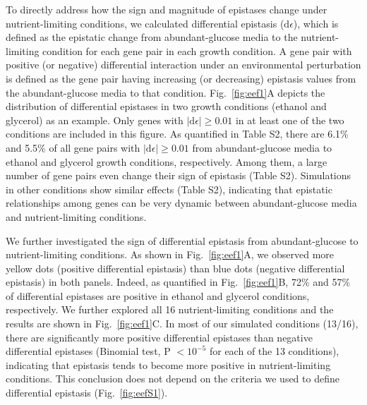 \documentclass[10pt]{article}
\def\D{\mathrm{d}}
\newcommand{\Fig}{Fig.}
\begin{document}
To directly address how the sign and magnitude of epistases change
under nutrient-limiting conditions, we calculated differential
epistasis ($\D\epsilon$), which is defined as the epistatic change from
abundant-glucose media to the nutrient-limiting condition for each
gene pair in each growth condition. A gene pair with positive (or
negative) differential interaction under an environmental perturbation
is defined as the gene pair having increasing (or decreasing)
epistasis values from the abundant-glucose media to that
condition. \Fig~\ref{fig:eef1}A depicts the
distribution of differential
epistases in two growth conditions (ethanol and glycerol) as an
example. Only genes with $\left|\D\epsilon\right| \geq 0.01$ in at least
one of the two conditions are included in this figure. As quantified
in Table S2, there are 6.1\% and 5.5\% of all gene pairs with
$\left|\D\epsilon\right| \geq 0.01$ from abundant-glucose media to ethanol
and glycerol growth conditions, respectively. Among them, a large
number of gene pairs even change their sign of epistasis (Table
S2). Simulations in other conditions show similar effects (Table S2),
indicating that epistatic relationships among genes can be very
dynamic between abundant-glucose media and nutrient-limiting
conditions.



We further investigated the sign of differential epistasis from
abundant-glucose to nutrient-limiting conditions. As shown in \Fig~\ref{fig:eef1}A, 
we observed more yellow dots (positive differential epistasis)
than blue dots (negative differential epistasis) in both
panels. Indeed, as quantified in \Fig~\ref{fig:eef1}B, 72\% and 57\% of
differential epistases are positive in ethanol and glycerol
conditions, respectively. We further explored all 16 nutrient-limiting
conditions and the results are shown in \Fig~\ref{fig:eef1}C. In most of our
simulated conditions (13/16), there are significantly more positive
differential epistases than negative differential epistases (Binomial
test, P $< 10^{-5}$ for each of the 13 conditions), indicating that
epistasis tends to become more positive in nutrient-limiting
conditions. This conclusion does not depend on the criteria we used to
define differential epistasis (\Fig~\ref{fig:eefS1}).
\end{document}
